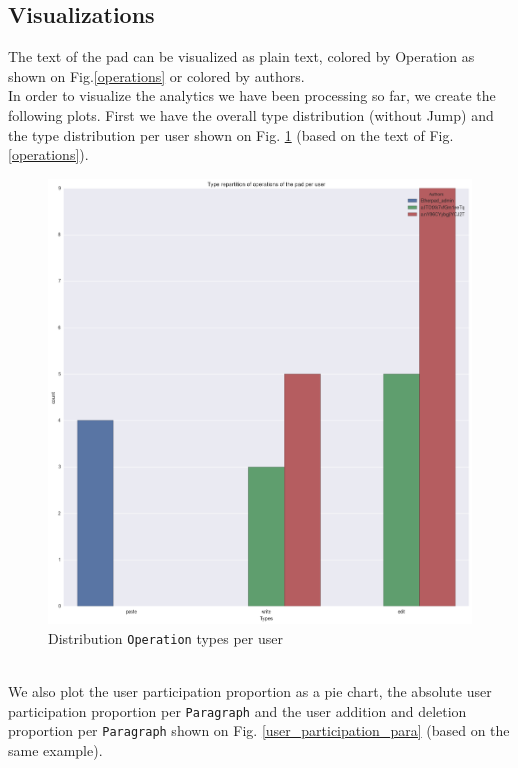 \documentclass[a4, twocolumn, 12pt]{article}
\begin{document}
\subsection{Visualizations}
The text of the pad can be visualized as plain text, colored by Operation as shown on Fig.\ref{operations} or colored by authors.\\
In order to visualize the analytics we have been processing so far, we create the following plots. First we have the overall type distribution (without Jump) and the type distribution per user shown on Fig. \ref{types_per_user} (based on the text of Fig.\ref{operations}). 
\begin{figure}[h]
\centering
\includegraphics[scale=0.2]{figures/types_per_user.png}
\caption{Distribution \texttt{Operation} types per user}
\label{types_per_user}
\end{figure}
\\
We also plot the user participation proportion as a pie chart, the absolute user participation proportion per \texttt{Paragraph} and the user addition and deletion proportion per \texttt{Paragraph} shown on Fig. \ref{user_participation_para} (based on the same example).
\end{document}
